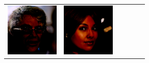 \documentclass{article}
\newcommand{\pganw}{1.0in}
\begin{document}
\begin{table}[htbp]
\begin{center}
\begin{tabular}{cc|cc|cc}
\includegraphics[width=\pganw]{figures/pgan/12_base_raw_reject.png} &
\includegraphics[width=\pganw]{figures/pgan/13_base_raw_base.png} &

\end{tabular}
\end{center}
\end{table}
\end{document}
